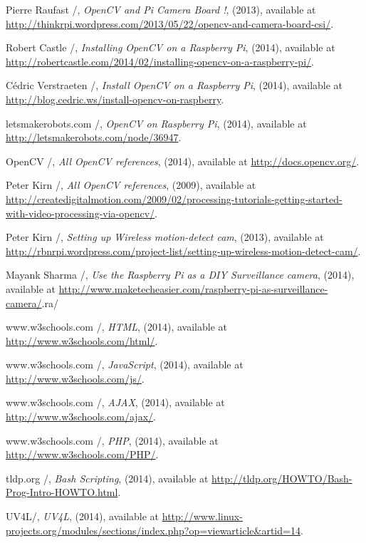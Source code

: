 \documentclass[12pt]{report}
\begin{document}
\begin{thebibliography}{99}
 Pierre Raufast /, \emph{OpenCV and Pi Camera Board !}, (2013), available at
\url{http://thinkrpi.wordpress.com/2013/05/22/opencv-and-camera-board-csi/}.


 Robert Castle /, \emph{Installing OpenCV on a Raspberry Pi}, (2014), available at
\url{http://robertcastle.com/2014/02/installing-opencv-on-a-raspberry-pi/}.

 Cédric Verstraeten /, \emph{Install OpenCV on a Raspberry Pi}, (2014), available at
\url{http://blog.cedric.ws/install-opencv-on-raspberry}.

 letsmakerobots.com /, \emph{OpenCV on Raspberry Pi}, (2014), available at
\url{http://letsmakerobots.com/node/36947}.

 OpenCV /, \emph{All OpenCV references}, (2014), available at
\url{http://docs.opencv.org/}.

 Peter Kirn /, \emph{All OpenCV references}, (2009), available at
\url{http://createdigitalmotion.com/2009/02/processing-tutorials-getting-started-with-video-processing-via-opencv/}.

 Peter Kirn /, \emph{Setting up Wireless motion-detect cam}, (2013), available at
\url{http://rbnrpi.wordpress.com/project-list/setting-up-wireless-motion-detect-cam/}.

 Mayank Sharma /, \emph{Use the Raspberry Pi as a DIY Surveillance camera}, (2014), available at
\url{http://www.maketecheasier.com/raspberry-pi-as-surveillance-camera/}.ra/


 www.w3schools.com /, \emph{HTML}, (2014), available at
\url{http://www.w3schools.com/html/}.

 www.w3schools.com /, \emph{JavaScript}, (2014), available at
\url{http://www.w3schools.com/js/}.

 www.w3schools.com /, \emph{AJAX}, (2014), available at
\url{http://www.w3schools.com/ajax/}.

 www.w3schools.com /, \emph{PHP}, (2014), available at
\url{http://www.w3schools.com/PHP/}.

 tldp.org /, \emph{Bash Scripting}, (2014), available at
\url{http://tldp.org/HOWTO/Bash-Prog-Intro-HOWTO.html}.

UV4L/, \emph{UV4L}, (2014), available at
\url{http://www.linux-projects.org/modules/sections/index.php?op=viewarticle&artid=14}.

\end{thebibliography}
\end{document}
